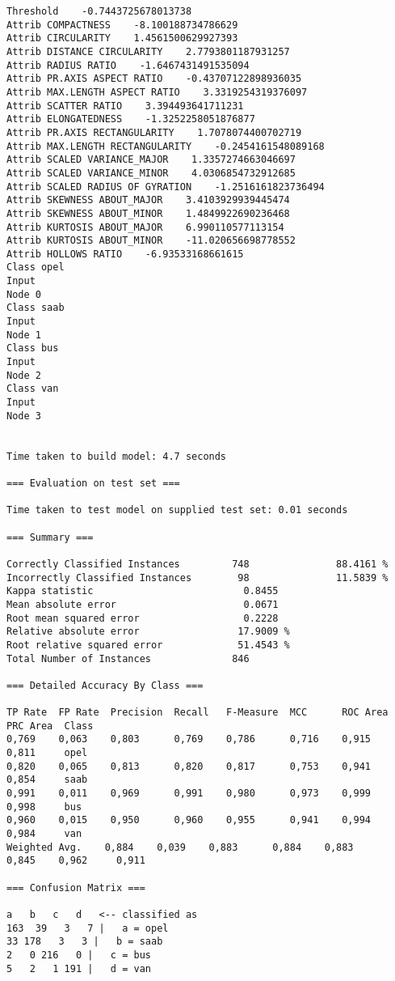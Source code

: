 \documentclass[
	article,			%
	11pt,				%
	oneside,			%
	a4paper,			%
	english,			%
	brazil,				%
	sumario=tradicional
	]{abntex2}
\begin{document}
\begin{lstlisting}
Threshold    -0.7443725678013738
Attrib COMPACTNESS    -8.100188734786629
Attrib CIRCULARITY    1.4561500629927393
Attrib DISTANCE CIRCULARITY    2.7793801187931257
Attrib RADIUS RATIO    -1.6467431491535094
Attrib PR.AXIS ASPECT RATIO    -0.43707122898936035
Attrib MAX.LENGTH ASPECT RATIO    3.3319254319376097
Attrib SCATTER RATIO    3.394493641711231
Attrib ELONGATEDNESS    -1.3252258051876877
Attrib PR.AXIS RECTANGULARITY    1.7078074400702719
Attrib MAX.LENGTH RECTANGULARITY    -0.2454161548089168
Attrib SCALED VARIANCE_MAJOR    1.3357274663046697
Attrib SCALED VARIANCE_MINOR    4.0306854732912685
Attrib SCALED RADIUS OF GYRATION    -1.2516161823736494
Attrib SKEWNESS ABOUT_MAJOR    3.4103929939445474
Attrib SKEWNESS ABOUT_MINOR    1.4849922690236468
Attrib KURTOSIS ABOUT_MAJOR    6.990110577113154
Attrib KURTOSIS ABOUT_MINOR    -11.020656698778552
Attrib HOLLOWS RATIO    -6.93533168661615
Class opel
Input
Node 0
Class saab
Input
Node 1
Class bus
Input
Node 2
Class van
Input
Node 3


Time taken to build model: 4.7 seconds

=== Evaluation on test set ===

Time taken to test model on supplied test set: 0.01 seconds

=== Summary ===

Correctly Classified Instances         748               88.4161 %
Incorrectly Classified Instances        98               11.5839 %
Kappa statistic                          0.8455
Mean absolute error                      0.0671
Root mean squared error                  0.2228
Relative absolute error                 17.9009 %
Root relative squared error             51.4543 %
Total Number of Instances              846     

=== Detailed Accuracy By Class ===

TP Rate  FP Rate  Precision  Recall   F-Measure  MCC      ROC Area  PRC Area  Class
0,769    0,063    0,803      0,769    0,786      0,716    0,915     0,811     opel
0,820    0,065    0,813      0,820    0,817      0,753    0,941     0,854     saab
0,991    0,011    0,969      0,991    0,980      0,973    0,999     0,998     bus
0,960    0,015    0,950      0,960    0,955      0,941    0,994     0,984     van
Weighted Avg.    0,884    0,039    0,883      0,884    0,883      0,845    0,962     0,911     

=== Confusion Matrix ===

a   b   c   d   <-- classified as
163  39   3   7 |   a = opel
33 178   3   3 |   b = saab
2   0 216   0 |   c = bus
5   2   1 191 |   d = van


\end{lstlisting}
\end{document}
